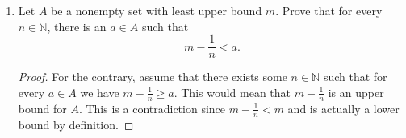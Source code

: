\documentclass{article}
\begin{document}
\begin{enumerate}
\begin{proof}
            \end{proof}
        
        \item Let $A$ be a nonempty set with least upper bound $m$. Prove that for every $n \in \mathbb{N}$, there is an $a \in A$ such that
            \[m - \frac{1}{n} < a.\]
            
            \begin{proof}
                For the contrary, assume that there exists some $n \in \mathbb{N}$ such that for every $a \in A$ we have $m - \frac{1}{n} \geq a$. This would mean that $m - \frac{1}{n}$ is an upper bound for $A$. This is a contradiction since $m - \frac{1}{n} < m$ and is actually a lower bound by definition.
                
            \end{proof}
            
    \end{enumerate}
\end{document}
